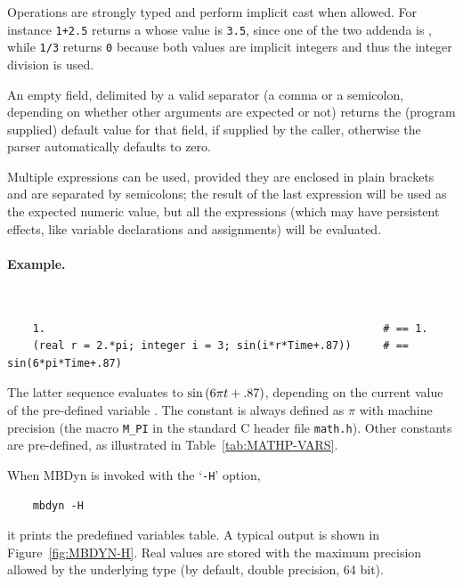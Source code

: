 Operations are strongly typed and perform implicit cast when allowed.
For instance \texttt{1+2.5} returns a  whose value 
is \texttt{3.5}, since one of the 
two addenda is , while \texttt{1/3} returns \texttt{0} because 
both values are implicit integers and thus the integer division is used.

An empty field, delimited by a valid separator (a comma or a semicolon,
depending on whether other arguments are expected or not) returns the
(program supplied) default value for that field, if supplied by the caller, 
otherwise the parser automatically defaults to zero.

Multiple expressions can be used, provided they are enclosed in plain 
brackets and are separated by semicolons; the result 
of the last expression will be used as the expected numeric value,
but all the expressions (which may have persistent effects, 
like variable declarations and assignments) will be evaluated.

\paragraph{Example.} \
\begin{verbatim}
    1.                                                     # == 1.
    (real r = 2.*pi; integer i = 3; sin(i*r*Time+.87))     # == sin(6*pi*Time+.87)
\end{verbatim}
The latter sequence evaluates to $ \sin\left( 6\pi{t}+.87 \right) $,
depending on the current value of the pre-defined variable .
The constant \kw{pi} is always defined as $ \pi $ with machine precision
(the macro \texttt{M\_PI} in the standard C header file \texttt{math.h}).
Other constants are pre-defined, as illustrated
in Table~\ref{tab:MATHP-VARS}.

When MBDyn is invoked with the `\texttt{-H}' option,
\begin{verbatim}
    mbdyn -H
\end{verbatim}
it prints the predefined variables table.
A typical output is shown in Figure~\ref{fig:MBDYN-H}.
Real values are stored with the maximum precision allowed by the underlying
\kw{real} type (by default, double precision, 64 bit).


